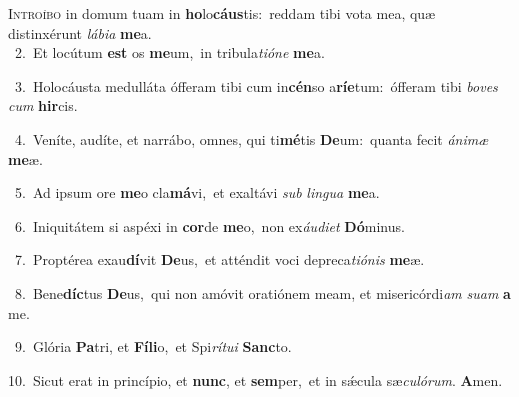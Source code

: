 \lettrine{\initial\textcolor{\initialcolor}{I}}{ntroíbo} in domum tuam in \textbf{ho}\-lo\-\textbf{cáus}\-tis:~\star reddam tibi vota mea, quæ distinxérunt \textit{lá}\-\textit{bi}\textit{a} \textbf{me}\-a.\\
{\numbfont\textcolor{\numbcolor}{~2.}}~Et locútum \textbf{est} os \textbf{me}\-um,~\star in tribula\-\textit{ti}\-\textit{ó}\textit{ne} \textbf{me}\-a.\par
{\numbfont\textcolor{\numbcolor}{~3.}}~Holocáusta medulláta ófferam tibi cum in\-\textbf{cén}\-so a\-\textbf{rí}\-\textbf{e}tum:~\star ófferam tibi \textit{bo}\-\textit{ves} \textit{cum} \textbf{hir}\-cis.\par
{\numbfont\textcolor{\numbcolor}{~4.}}~Veníte, audíte, et narrábo, omnes, qui ti\-\textbf{mé}\-tis \textbf{De}\-um:~\star quanta fecit \textit{á}\-\textit{ni}\textit{mæ} \textbf{me}\-æ.\par
{\numbfont\textcolor{\numbcolor}{~5.}}~Ad ipsum ore \textbf{me}\-o cla\-\textbf{má}\-vi,~\star et exaltávi \textit{sub} \textit{lin}\-\textit{gua} \textbf{me}\-a.\par
{\numbfont\textcolor{\numbcolor}{~6.}}~Iniquitátem si aspéxi in \textbf{cor}\-de \textbf{me}\-o,~\star non ex\-\textit{áu}\-\textit{di}\textit{et} \textbf{Dó}\-minus.\par
{\numbfont\textcolor{\numbcolor}{~7.}}~Proptérea exau\-\textbf{dí}\-vit \textbf{De}\-us,~\star et atténdit voci depreca\-\textit{ti}\-\textit{ó}\textit{nis} \textbf{me}\-æ.\par
{\numbfont\textcolor{\numbcolor}{~8.}}~Bene\-\textbf{díc}\-tus \textbf{De}\-us,~\star qui non amóvit oratiónem meam, et misericórdi\textit{am} \textit{su}\-\textit{am} \textbf{a} me.\par
{\numbfont\textcolor{\numbcolor}{~9.}}~Glória \textbf{Pa}\-tri, et \textbf{Fí}\-\textbf{li}o,~\star et Spi\-\textit{rí}\-\textit{tu}\textit{i} \textbf{Sanc}\-to.\par
{\numbfont\textcolor{\numbcolor}{10.}}~Sicut erat in princípio, et \textbf{nunc}\-, et \textbf{sem}\-per,~\star et in sǽcula sæ\-\textit{cu}\-\textit{ló}\textit{rum}. \textbf{A}\-men.\par
